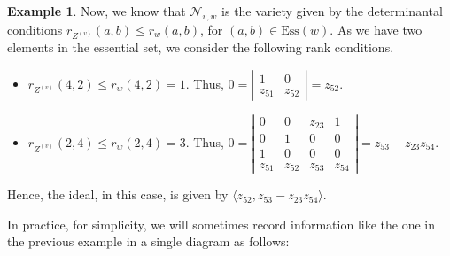 \documentclass[11pt]{amsart}
\theoremstyle{definition}
\newtheorem{example}[theorem]{Example}
\theoremstyle{definition}
\theoremstyle{definition}
\theoremstyle{definition}
\newcommand{\Nvw}{\mathcal{N}_{v,w}}
\begin{document}
\begin{example}
\noindent Now, we know that $\Nvw$ is the variety given by the determinantal conditions $r_{Z^{(v)}}(a,b)\leq r_w(a,b)$, for $(a,b) \in \mathrm{Ess}(w)$. As we have two elements in the essential set, we consider the following rank conditions. 
    \begin{itemize}
        \item $r_{Z^{(v)}}(4,2) \leq r_{w}(4,2) = 1$. Thus,  $0=\left|\begin{array}{cc}
            1 & 0 \\
            z_{51} & z_{52} 
        \end{array}\right| = z_{52}$.
        \item $r_{Z^{(v)}}(2,4) \leq r_{w}(2,4) = 3$. Thus, $0=\left|  \begin{array}{cccc}
            0 & 0 & z_{23} & 1  \\
            0 & 1 & 0 & 0  \\
            1 & 0 & 0 & 0  \\
            z_{51} & z_{52} & z_{53} & z_{54}
        \end{array}\right| = z_{53} - z_{23} z_{54}$. 
    \end{itemize}
    Hence, the ideal, in this case, is given by $\langle z_{52}, z_{53} - z_{23} z_{54}\rangle$.
\end{example}

\noindent In practice, for simplicity, we will sometimes record information like the one in the previous example in a single diagram as follows:
\end{document}
